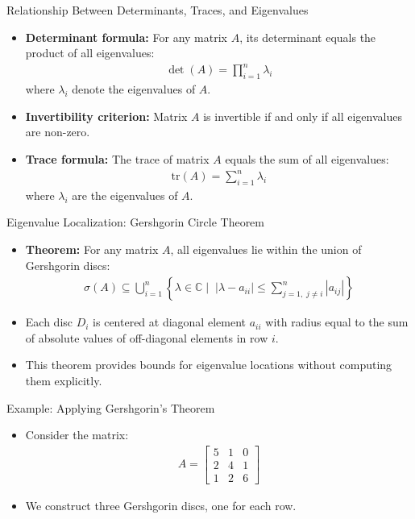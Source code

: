 \begin{frame}{Relationship Between Determinants, Traces, and Eigenvalues}
\begin{itemize}
    \item \textbf{Determinant formula:} For any matrix $A$, its determinant equals the product of all eigenvalues:
    \begin{align}
        \det(A) = \prod_{i=1}^n \lambda_i
    \end{align}
    where $\lambda_i$ denote the eigenvalues of $A$.
    \item \textbf{Invertibility criterion:} Matrix $A$ is invertible if and only if all eigenvalues are non-zero.
    
    \item \textbf{Trace formula:} The trace of matrix $A$ equals the sum of all eigenvalues:
    \begin{align}
        \text{tr}(A) = \sum_{i=1}^n \lambda_i
    \end{align}
    where $\lambda_i$ are the eigenvalues of $A$.
\end{itemize} 
\end{frame}



\begin{frame}{Eigenvalue Localization: Gershgorin Circle Theorem}
\begin{itemize}
    \item \textbf{Theorem:} For any matrix $A$, all eigenvalues lie within the union of Gershgorin discs:
    \begin{align}
        \sigma(A) \subseteq \bigcup_{i=1}^n \left\{ \lambda \in \mathbb{C} \mid \; |\lambda - a_{ii}| \leq \sum_{j=1, \; j\neq i}^n |a_{ij}| \right\}
    \end{align}
    \item Each disc $D_i$ is centered at diagonal element $a_{ii}$ with radius equal to the sum of absolute values of off-diagonal elements in row $i$.
    \item This theorem provides bounds for eigenvalue locations without computing them explicitly.
\end{itemize} 
\end{frame}

\begin{frame}{Example: Applying Gershgorin's Theorem}
\begin{itemize}
    \item Consider the matrix:
    \begin{align*}
         A = \begin{bmatrix}
        5 & 1 & 0 \\
        2 & 4 & 1 \\
        1 & 2 & 6
        \end{bmatrix}
    \end{align*}
    \item We construct three Gershgorin discs, one for each row.
\end{itemize}
\end{frame}

